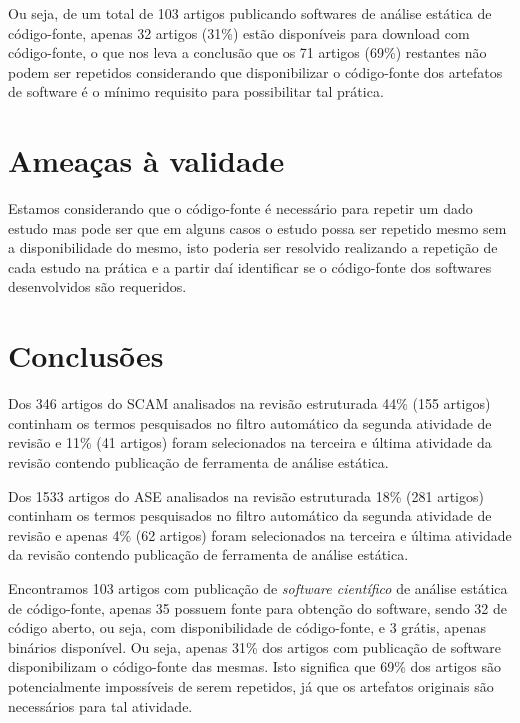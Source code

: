 
Ou seja, de um total de 103 artigos publicando softwares de análise estática de
código-fonte, apenas 32 artigos (31\%) estão disponíveis para download com
código-fonte, o que nos leva a conclusão que os 71 artigos (69\%) restantes não
podem ser repetidos considerando que disponibilizar o código-fonte dos
artefatos de software é o mínimo requisito para possibilitar tal prática.

\section{Ameaças à validade}

Estamos considerando que o código-fonte é necessário para repetir um dado
estudo mas pode ser que em alguns casos o estudo possa ser repetido mesmo sem a
disponibilidade do mesmo, isto poderia ser resolvido realizando a repetição
de cada estudo na prática e a partir daí identificar se o código-fonte dos
softwares desenvolvidos são requeridos.


\section{Conclusões}

Dos 346 artigos do SCAM analisados na revisão estruturada 44\% (155 artigos)
continham os termos pesquisados no filtro automático da segunda atividade de
revisão e 11\% (41 artigos) foram selecionados na terceira e última atividade
da revisão contendo publicação de ferramenta de análise estática.

Dos 1533 artigos do ASE analisados na revisão estruturada 18\% (281 artigos)
continham os termos pesquisados no filtro automático da segunda atividade de
revisão e apenas 4\% (62 artigos) foram selecionados na terceira e última
atividade da revisão contendo publicação de ferramenta de análise estática.


Encontramos 103 artigos com publicação de {\it software científico} de análise
estática de código-fonte, apenas 35 possuem fonte para obtenção do software,
sendo 32 de código aberto, ou seja, com disponibilidade de código-fonte, e 3
grátis, apenas binários disponível. Ou seja, apenas 31\% dos artigos com
publicação de software disponibilizam o código-fonte das mesmas. Isto significa
que 69\% dos artigos são potencialmente impossíveis de serem repetidos, já que
os artefatos originais são necessários para tal atividade.

